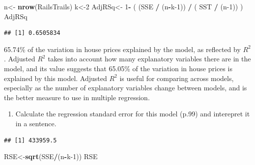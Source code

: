 \documentclass[]{article}
\newenvironment{Shaded}{\begin{snugshade}}{\end{snugshade}}
\newcommand{\DecValTok}[1]{\textcolor[rgb]{0.00,0.00,0.81}{#1}}
\newcommand{\KeywordTok}[1]{\textcolor[rgb]{0.13,0.29,0.53}{\textbf{#1}}}
\newcommand{\NormalTok}[1]{#1}
\newcommand{\OperatorTok}[1]{\textcolor[rgb]{0.81,0.36,0.00}{\textbf{#1}}}
\newcommand{\StringTok}[1]{\textcolor[rgb]{0.31,0.60,0.02}{#1}}
\providecommand{\tightlist}{%
  \setlength{\itemsep}{0pt}\setlength{\parskip}{0pt}}
\begin{document}
\begin{Shaded}
\begin{Highlighting}[]
\NormalTok{n<-}\StringTok{ }\KeywordTok{nrow}\NormalTok{(RailsTrails)}
\NormalTok{k<-}\DecValTok{2}
\NormalTok{AdjRSq<-}\StringTok{ }\DecValTok{1}\OperatorTok{-}\StringTok{ }\NormalTok{( (SSE }\OperatorTok{/}\StringTok{ }\NormalTok{(n}\OperatorTok{-}\NormalTok{k}\DecValTok{-1}\NormalTok{)) }\OperatorTok{/}\StringTok{ }\NormalTok{( SST }\OperatorTok{/}\StringTok{ }\NormalTok{(n}\DecValTok{-1}\NormalTok{)) )}
\NormalTok{AdjRSq}
\end{Highlighting}
\end{Shaded}

\begin{verbatim}
## [1] 0.6505834
\end{verbatim}

65.74\% of the variation in house prices explained by the model, as
reflected by \(R^2\). Adjusted \(R^2\) takes into account how many
explanatory variables there are in the model, and its value suggests
that 65.05\% of the variation in house prices is explained by this
model. Adjusted \(R^2\) is useful for comparing across models,
especially as the number of explanatory variables change between models,
and is the better measure to use in multiple regression.

\begin{enumerate}
\def\labelenumi{\arabic{enumi}.}
\tightlist
\item
  Calculate the regression standard error for this model (p.99) and
  interepret it in a sentence.
\end{enumerate}

\begin{Shaded}
\end{Shaded}

\begin{verbatim}
## [1] 433959.5
\end{verbatim}

\begin{Shaded}
\begin{Highlighting}[]
\NormalTok{RSE<-}\KeywordTok{sqrt}\NormalTok{(SSE}\OperatorTok{/}\NormalTok{(n}\OperatorTok{-}\NormalTok{k}\DecValTok{-1}\NormalTok{))}
\NormalTok{RSE}
\end{Highlighting}
\end{Shaded}
\end{document}
